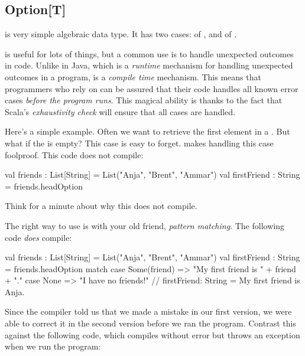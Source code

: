 \documentclass[9pt]{extbook}
\begin{document}
\subsection{Option[T]}

 is very simple algebraic data type.  It has two cases:  of , and  of .

 is useful for lots of things, but a common use is to handle unexpected outcomes in code.  Unlike  in Java, which is a \emph{runtime} mechanism for handling unexpected outcomes in a program,  is a \emph{compile time} mechanism.  This means that programmers who rely on  can be assured that their code handles all known error cases \emph{before the program runs}.  This magical ability is thanks to the fact that Scala's \emph{exhaustivity check} will ensure that all cases are handled.

Here's a simple example.  Often we want to retrieve the first element in a .  But what if the  is empty?  This case is easy to forget.   makes handling this case foolproof.  This code does not compile:

\begin{scalacode}
val friends : List[String] = List("Anja", "Brent", "Ammar")
val firstFriend : String = friends.headOption
\end{scalacode}

Think for a minute about why this does not compile.

The right way to use  is with your old friend, \emph{pattern matching}.  The following code \emph{does} compile:

\begin{scalacode}
val friends : List[String] = List("Anja", "Brent", "Ammar")
val firstFriend : String = friends.headOption match {
  case Some(friend) => "My first friend is " + friend + "."
  case None => "I have no friends!"
}
// firstFriend: String = My first friend is Anja.
\end{scalacode}

Since the compiler told us that we made a mistake in our first version, we were able to correct it in the second version before we ran the program.  Contrast this against the following code, which compiles without error but throws an exception when we run the program:
\end{document}
